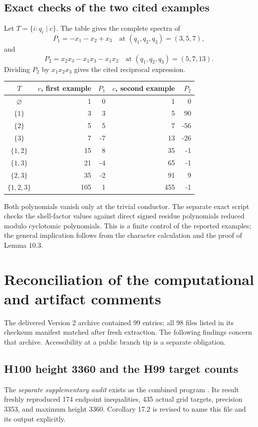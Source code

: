 \documentclass[11pt]{article}
\begin{document}
\subsection*{Exact checks of the two cited examples}
Let \(T=\{i:q_i\mid c\}\). The table gives the complete spectra of
\[
P_1=-x_1-x_2+x_3
\quad\text{at }(q_1,q_2,q_3)=(3,5,7),
\]
and
\[
P_2=x_2x_3-x_1x_3-x_1x_2
\quad\text{at }(q_1,q_2,q_3)=(5,7,13).
\]
Dividing \(P_2\) by \(x_1x_2x_3\) gives the cited reciprocal expression.
\begin{center}
\begin{tabular}{@{}crrrr@{}}\toprule
\(T\) & \(c\), first example & \(P_1\) & \(c\), second example & \(P_2\)\\\midrule
\(\varnothing\)&1&0&1&0\\
\(\{1\}\)&3&3&5&90\\
\(\{2\}\)&5&5&7&-56\\
\(\{3\}\)&7&-7&13&-26\\
\(\{1,2\}\)&15&8&35&-1\\
\(\{1,3\}\)&21&-4&65&-1\\
\(\{2,3\}\)&35&-2&91&9\\
\(\{1,2,3\}\)&105&1&455&-1\\\bottomrule
\end{tabular}
\end{center}
Both polynomials vanish only at the trivial conductor.
The separate exact script
 checks the shell-factor
values against direct signed residue polynomials reduced modulo
cyclotomic polynomials. This is a finite control of the reported
examples; the general implication follows from the character calculation
and the proof of Lemma 10.3.

\section{Reconciliation of the computational and artifact comments}
The delivered Version 2 archive contained 99 entries; all 98 files
listed in its checksum manifest matched after fresh extraction.
The following findings concern that archive. Accessibility at a public
branch tip is a separate obligation.

\subsection*{H100 height 3360 and the H99 target counts}
The \emph{separate supplementary audit} exists as the combined program
.
Its  result freshly reproduced 174 endpoint inequalities,
435 actual grid targets, precision 3353, and maximum height 3360.
Corollary 17.2 is revised to name this file and its output explicitly.
\end{document}
